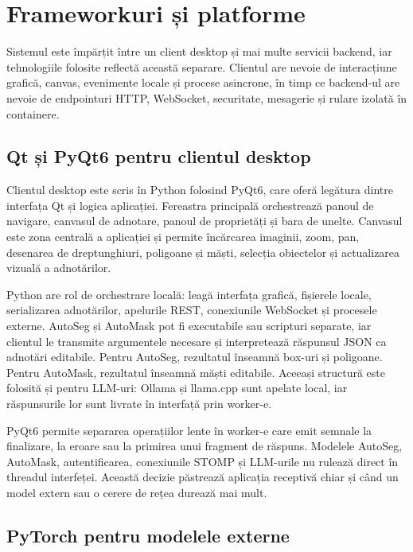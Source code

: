 \section{Frameworkuri și platforme}
\label{sec:frameworkuri-platforme}

Sistemul este împărțit între un client desktop și mai multe servicii backend, iar tehnologiile folosite reflectă această separare.
Clientul are nevoie de interacțiune grafică, canvas, evenimente locale și procese asincrone, în timp ce backend-ul are nevoie de endpointuri HTTP, WebSocket, securitate, mesagerie și rulare izolată în containere.

\subsection{Qt și PyQt6 pentru clientul desktop}
\label{subsec:qt-pyqt}

Clientul desktop este scris în Python folosind PyQt6, care oferă legătura dintre interfața Qt și logica aplicației.
Fereastra principală orchestrează panoul de navigare, canvasul de adnotare, panoul de proprietăți și bara de unelte.
Canvasul este zona centrală a aplicației și permite încărcarea imaginii, zoom, pan, desenarea de dreptunghiuri, poligoane și măști, selecția obiectelor și actualizarea vizuală a adnotărilor.

Python are rol de orchestrare locală: leagă interfața grafică, fișierele locale, serializarea adnotărilor, apelurile REST, conexiunile WebSocket și procesele externe.
AutoSeg și AutoMask pot fi executabile sau scripturi separate, iar clientul le transmite argumentele necesare și interpretează răspunsul JSON ca adnotări editabile.
Pentru AutoSeg, rezultatul înseamnă box-uri și poligoane.
Pentru AutoMask, rezultatul înseamnă măști editabile.
Aceeași structură este folosită și pentru LLM-uri: Ollama și llama.cpp sunt apelate local, iar răspunsurile lor sunt livrate în interfață prin worker-e.

PyQt6 permite separarea operațiilor lente în worker-e care emit semnale la finalizare, la eroare sau la primirea unui fragment de răspuns.
Modelele AutoSeg, AutoMask, autentificarea, conexiunile STOMP și LLM-urile nu rulează direct în threadul interfeței.
Această decizie păstrează aplicația receptivă chiar și când un model extern sau o cerere de rețea durează mai mult.

\subsection{PyTorch pentru modelele externe}
\label{subsec:pytorch-modele}

